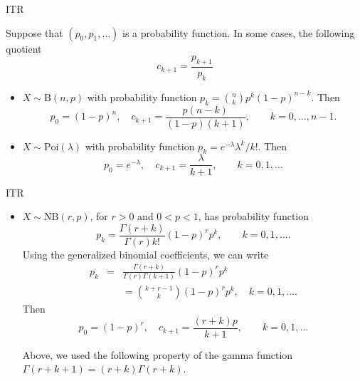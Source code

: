 \documentclass[aspectratio=169]{beamer}
\begin{document}
\begin{frame}{ITR}

Suppose that $(p_0,p_1,\ldots)$ is a probability function. In some cases, the following quotient
$$c_{k+1}=\frac{p_{k+1}}{p_k}$$

\pause
\begin{itemize}
\item $X\sim \mbox{B}(n,p)$ with probability function  $p_k={n\choose k} p^k(1-p)^{n-k}$. Then
$$p_0=(1-p)^n,\quad c_{k+1}=\frac{p(n-k)}{(1-p)(k+1)},\qquad k=0,\ldots,n-1.$$
\pause
\item $X\sim \mbox{Poi}(\lambda)$ with probability function
  $p_k=e^{-\lambda}\lambda^k/k!$. Then
$$p_0=e^{-\lambda},\quad c_{k+1}=\frac{\lambda}{k+1},\qquad k=0,1,\ldots$$

\end{itemize}

\end{frame}





\begin{frame}{ITR}

\begin{itemize}
\item
  $X\sim \mbox{NB}(r,p)$, for $r>0$ and $0<p<1$,
has probability function
   $$p_k=\frac{\Gamma(r+k)}{\Gamma(r)k!}(1-p)^rp^k,\qquad  k=0,1,\ldots.$$
Using the generalized binomial coefficients, we can write
\begin{eqnarray*}
  p_k&=&\frac{\Gamma(r+k)}{\Gamma(r)\Gamma(k+1)}(1-p)^rp^k
\\
  &&  = {k+r-1\choose k}(1-p)^rp^k,\quad k=0,1,\ldots.
\end{eqnarray*}
Then
 $$p_0=(1-p)^r,\quad c_{k+1}=\frac{(r+k)p}{k+1},\qquad k=0,1,\ldots$$

  Above,  we used the following property of the gamma function
  $\Gamma(r+k+1)=(r+k)\Gamma(r+k)$.
\end{itemize}

\end{frame}
\end{document}
